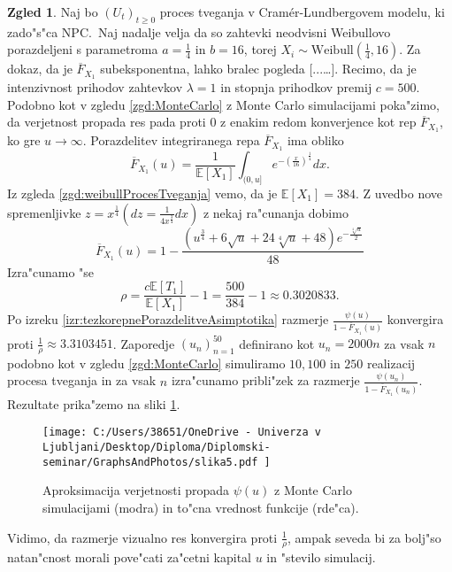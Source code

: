\documentclass[12pt, a4paper, reqno]{amsart}
\theoremstyle{definition}
\newtheorem{zgled}[definicija]{Zgled}
\theoremstyle{plain}
\newcommand{\E}{\mathbb{E}}
\newcommand{\1}{\mathds{1}}
\begin{document}
        \begin{zgled}
        Naj bo $(U_t)_{t\geq0}$ proces tveganja v Cramér-Lundbergovem modelu, ki zado"s"ca NPC.\ Naj 
        nadalje velja da so zahtevki neodvisni Weibullovo porazdeljeni s parametroma
        $a= \frac{1}{4}$ in $b= 16$, torej $X_i\sim\text{Weibull}(\frac{1}{4}, 16)$. 
        Za dokaz, da je $\overline{F}_{X_1}$ subeksponentna, lahko bralec pogleda [...\dots].
        Recimo, da je intenzivnost 
        prihodov zahtevkov $\lambda = 1$ in stopnja prihodkov premij $c = 500$.
        Podobno kot v zgledu \ref{zgd:MonteCarlo} z Monte Carlo simulacijami poka"zimo, da 
        verjetnost propada res pada proti $0$
        z enakim redom konverjence kot rep $\overline{F}_{X_1}$, ko gre $u\to\infty$. 
        Porazdelitev integriranega repa $\overline{F}_{X_1}$ ima obliko
        \begin{equation*}
            \overline{F}_{X_1}(u) = \frac{1}{\E\left[X_1\right]}\int_{(0, u]}e^{-\left(\tfrac{x}{16}\right)^{\tfrac{1}{4}}}dx.
        \end{equation*}
        Iz zgleda \ref{zgd:weibullProcesTveganja} vemo, da je $\E\left[X_1\right] = 384$. Z uvedbo nove spremenljivke
        $z = x^{\tfrac{1}{4}} (dz = \frac{1}{4x^\frac{3}{4}}dx)$ z nekaj ra"cunanja dobimo 
        \begin{equation*}
            \overline{F}_{X_1}(u) = 1 - \frac{\left(u^{\frac{3}{4}} + 6 \sqrt{u} + 24 \sqrt[4]{u} + 48\right)e^{-\frac{\sqrt[4]{u}}{2}}}{48}
        \end{equation*}
        Izra"cunamo "se 
        \begin{equation*}
        \rho = \frac{c \E\left[T_1\right]}{\E\left[X_1\right]} - 1 = \frac{500}{384} - 1 \approx 0.3020833.
        \end{equation*}
        Po izreku \ref{izr:tezkorepnePorazdelitveAsimptotika} razmerje $\tfrac{\psi(u)}{1 - \overline{F}_{X_1}(u)}$ konvergira proti $\tfrac{1}{\rho} \approx 3.3103451$.
        Zaporedje $(u_n)_{n = 1}^{50}$ definirano kot $u_n = 2000n$ za vsak $n$ podobno kot v zgledu \ref{zgd:MonteCarlo} simuliramo $10, 100$ in $250$ realizacij
        procesa tveganja in za vsak $n$ izra"cunamo pribli"zek za razmerje $\tfrac{\psi(u_n)}{1 - \overline{F}_{X_1}(u_n)}$.
        Rezultate prika"zemo na sliki \ref{fig:slika5}.
       
        \begin{figure}[H]       
            \centering
            \texttt{[image: 
                C:/Users/38651/OneDrive - Univerza v Ljubljani/Desktop/Diploma/Diplomski-seminar/GraphsAndPhotos/slika5.pdf
                ]}
            \caption{Aproksimacija verjetnosti propada $\psi(u)$ z Monte Carlo simulacijami (modra) in 
            to"cna vrednost funkcije (rde"ca).}
            \label{fig:slika5}
        \end{figure}

        \noindent
        Vidimo, da razmerje vizualno res konvergira proti $\tfrac{1}{\rho}$, ampak seveda bi 
        za bolj"so natan"cnost morali pove"cati za"cetni kapital $u$ in "stevilo simulacij. 
        \label{zg:MonteCarloTezkiRepi}
        \end{zgled}
\end{document}
